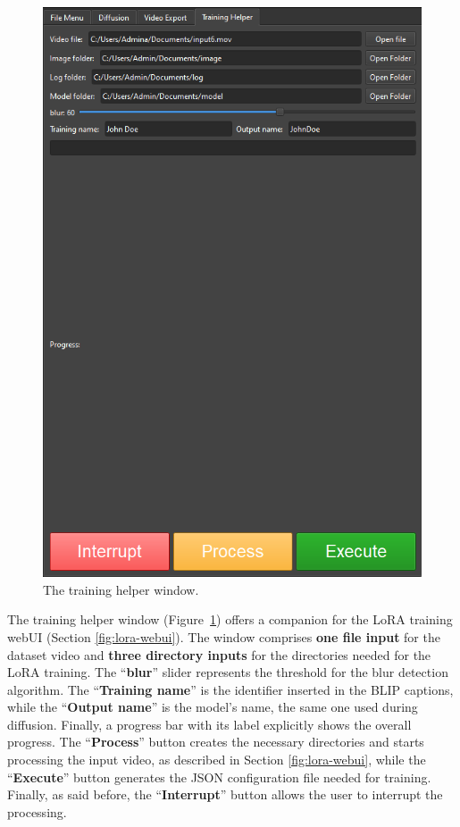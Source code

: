 \documentclass[preprint]{elsarticle}
\begin{document}
\begin{figure}[t]
	\centering
	\includegraphics[scale=0.3, keepaspectratio]{img/project_img/training-help.png}
	\caption{The training helper window.}
	\label{fig:training-helper}
\end{figure}


The training helper window (Figure~\ref{fig:training-helper}) offers a companion for the 
LoRA training webUI (Section \ref{fig:lora-webui}). 
The window comprises \textbf{one file input} for the dataset video and \textbf{three directory inputs} 
for the directories needed for the LoRA training. 
The ``\textbf{blur}'' slider represents the threshold for the blur detection algorithm. 
The ``\textbf{Training name}'' is the identifier inserted in the BLIP captions, 
while the ``\textbf{Output name}'' is the model's name, the same one used during diffusion. 
Finally, a progress bar with its label explicitly shows the overall progress.
The ``\textbf{Process}'' button creates the necessary directories and starts processing the 
input video, as described in Section \ref{fig:lora-webui}, while the ``\textbf{Execute}'' button generates the 
JSON configuration file needed for training.
Finally, as said before, the ``\textbf{Interrupt}'' button allows the user to interrupt the processing.
\end{document}
